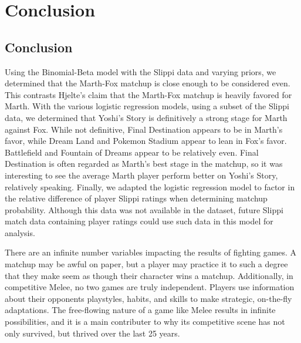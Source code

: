 \chapter{Conclusion}
\newpage

\section{Conclusion}

Using the Binomial-Beta model with the Slippi data and varying priors, we determined that the Marth-Fox matchup is close enough to be considered even. This contrasts Hjelte's claim that the Marth-Fox matchup is heavily favored for Marth. With the various logistic regression models, using a subset of the Slippi data, we determined that Yoshi's Story is definitively a strong stage for Marth against Fox. While not definitive, Final Destination appears to be in Marth's favor, while Dream Land and Pokemon Stadium appear to lean in Fox's favor. Battlefield and Fountain of Dreams appear to be relatively even. Final Destination is often regarded as Marth's best stage in the matchup, so it was interesting to see the average Marth player perform better on Yoshi's Story, relatively speaking. Finally, we adapted the logistic regression model to factor in the relative difference of player Slippi ratings when determining matchup probability. Although this data was not available in the dataset, future Slippi match data containing player ratings could use such data in this model for analysis.

\indent There are an infinite number variables impacting the results of fighting games. A matchup may be awful on paper, but a player may practice it to such a degree that they make seem as though their character wins a matchup. Additionally, in competitive Melee, no two games are truly independent. Players use information about their opponents playstyles, habits, and skills to make strategic, on-the-fly adaptations. The free-flowing nature of a game like Melee results in infinite possibilities, and it is a main contributer to why its competitive scene has not only survived, but thrived over the last 25 years.

